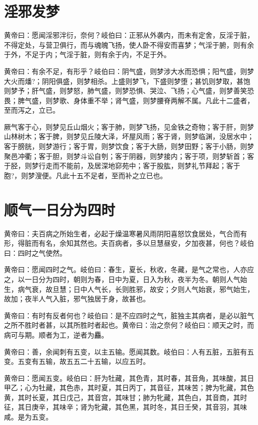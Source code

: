 \documentclass[12pt,UTF8]{ctexbook}
\begin{document}
	\chapter{淫邪发梦}
	
	黄帝曰：愿闻淫邪泮衍，奈何？岐伯曰：正邪从外袭内，而未有定舍，反淫于脏，不得定处，与营卫俱行，而与魂魄飞扬，使人卧不得安而喜梦；气淫于腑，则有余于外，不足于内；气淫于脏，则有余于内，不足于外。
	
	黄帝曰：有余不足，有形乎？岐伯曰：阴气盛，则梦涉大水而恐惧；阳气盛，则梦大火而燔?；阴阳俱盛，则梦相杀。上盛则梦飞，下盛则梦堕；甚饥则梦取，甚饱则梦予；肝气盛，则梦怒，肺气盛，则梦恐惧、哭泣、飞扬；心气盛，则梦善笑恐畏；脾气盛，则梦歌、身体重不举；肾气盛，则梦腰脊两解不属。凡此十二盛者，至而泻之，立已。
	
	厥气客于心，则梦见丘山烟火；客于肺，则梦飞扬，见金铁之奇物；客于肝，则梦山林树木；客于脾，则梦见丘陵大泽，坏屋风雨；客于肾，则梦临渊，没居水中；客于膀胱，则梦游行；客于胃，则梦饮食；客于大肠，则梦田野；客于小肠，则梦聚邑冲衢；客于胆，则梦斗讼自刳；客于阴器，则梦接内；客于项，则梦斩首；客于胫，则梦行走而不能前，及居深地窌苑中；客于股肱，则梦礼节拜起；客于胞?，则梦溲便。凡此十五不足者，至而补之立已也。
	\chapter{顺气一日分为四时}
	
	黄帝曰：夫百病之所始生者，必起于燥温寒暑风雨阴阳喜怒饮食居处，气合而有形，得脏而有名，余知其然也。夫百病者，多以旦慧昼安，夕加夜甚，何也？岐伯曰：四时之气使然。
	
	黄帝曰：愿闻四时之气。岐伯曰：春生，夏长，秋收，冬藏，是气之常也，人亦应之，以一日分为四时，朝则为春，日中为夏，日入为秋，夜半为冬。朝则人气始生，病气衰，故旦慧；日中人气长，长则胜邪，故安；夕则人气始衰，邪气始生，故加；夜半人气入脏，邪气独居于身，故甚也。
	
	黄帝曰：有时有反者何也？岐伯曰：是不应四时之气，脏独主其病者，是必以脏气之所不胜时者甚，以其所胜时者起也。黄帝曰：治之奈何？岐伯曰：顺天之时，而病可与期。顺者为工，逆者为麤。
	
	黄帝曰：善，余闻刺有五变，以主五输。愿闻其数。岐伯曰：人有五脏，五脏有五变。五变有五输，故五五二十五输，以应五时。
	
	黄帝曰：愿闻五变。岐伯曰：肝为牡藏，其色青，其时春，其音角，其味酸，其日甲乙；心为牡藏，其色赤，其时夏，其日丙丁，其音征，其味苦；脾为牝藏，其色黄，其时长夏，其日戊己，其音宫，其味甘；肺为牝藏，其色白，其音商，其时征，其日庚辛，其味辛；肾为牝藏，其色黑，其时冬，其日壬癸，其音羽，其味咸。是为五变。
	
\end{document}
